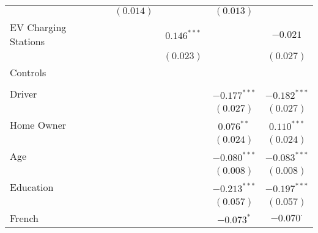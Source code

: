 \begin{center}
\begin{tiny}
\begin{longtable}{l@{} c@{} c@{} c@{} c@{} c@{}}
                                                      &                & $(0.014)$      &                & $(0.013)$        &                  \\
\quad EV Charging Stations                            &                &                & $0.146^{***}$  &                  & $-0.021$         \\
                                                      &                &                & $(0.023)$      &                  & $(0.027)$        \\
Controls                                              &                &                &                &                  &                  \\
                                                      &                &                &                &                  &                  \\
\quad Driver                                          &                &                &                & $-0.177^{***}$   & $-0.182^{***}$   \\
                                                      &                &                &                & $(0.027)$        & $(0.027)$        \\
\quad Home Owner                                      &                &                &                & $0.076^{**}$     & $0.110^{***}$    \\
                                                      &                &                &                & $(0.024)$        & $(0.024)$        \\
\quad Age                                             &                &                &                & $-0.080^{***}$   & $-0.083^{***}$   \\
                                                      &                &                &                & $(0.008)$        & $(0.008)$        \\
\quad Education                                       &                &                &                & $-0.213^{***}$   & $-0.197^{***}$   \\
                                                      &                &                &                & $(0.057)$        & $(0.057)$        \\
\quad French                                          &                &                &                & $-0.073^{*}$     & $-0.070^{\cdot}$ \\

\end{longtable}
\end{tiny}
\end{center}

